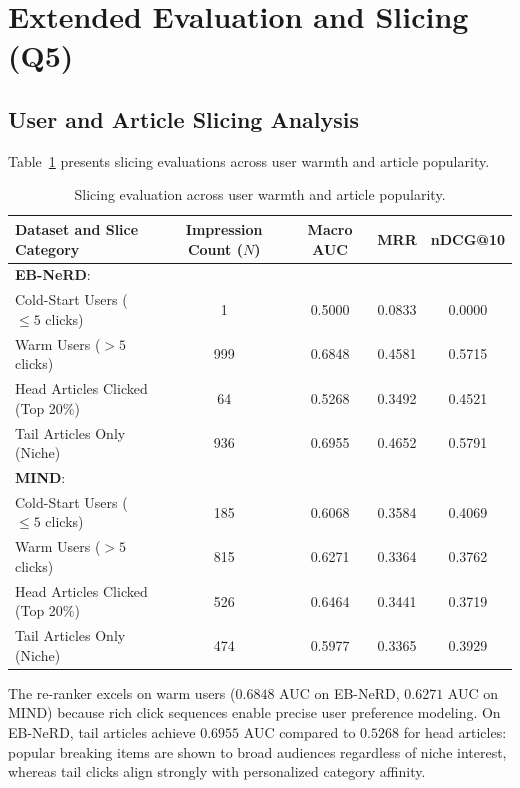 \documentclass[11pt,a4paper]{article}
\begin{document}
\section{Extended Evaluation and Slicing (Q5)}

\subsection{User and Article Slicing Analysis}
Table~\ref{tab:slicing} presents slicing evaluations across user warmth and article popularity.

\begin{table}[htbp]
\centering
\small
\setlength{\tabcolsep}{3pt}
\begin{tabular}{lcccc}
\toprule
\textbf{Dataset and Slice Category} & \textbf{Impression Count ($N$)} & \textbf{Macro AUC} & \textbf{MRR} & \textbf{nDCG@10} \\
\midrule
\textbf{EB-NeRD}: & & & & \\
\quad Cold-Start Users ($\le 5$ clicks) & 1 & 0.5000 & 0.0833 & 0.0000 \\
\quad Warm Users ($> 5$ clicks)         & 999 & 0.6848 & 0.4581 & 0.5715 \\
\quad Head Articles Clicked (Top 20\%) & 64 & 0.5268 & 0.3492 & 0.4521 \\
\quad Tail Articles Only (Niche)        & 936 & 0.6955 & 0.4652 & 0.5791 \\
\midrule
\textbf{MIND}: & & & & \\
\quad Cold-Start Users ($\le 5$ clicks) & 185 & 0.6068 & 0.3584 & 0.4069 \\
\quad Warm Users ($> 5$ clicks)         & 815 & 0.6271 & 0.3364 & 0.3762 \\
\quad Head Articles Clicked (Top 20\%) & 526 & 0.6464 & 0.3441 & 0.3719 \\
\quad Tail Articles Only (Niche)        & 474 & 0.5977 & 0.3365 & 0.3929 \\
\bottomrule
\end{tabular}
\caption{Slicing evaluation across user warmth and article popularity.}
\label{tab:slicing}
\end{table}

The re-ranker excels on warm users ($0.6848$ AUC on EB-NeRD, $0.6271$ AUC on MIND) because rich click sequences enable precise user preference modeling. On EB-NeRD, tail articles achieve $0.6955$ AUC compared to $0.5268$ for head articles: popular breaking items are shown to broad audiences regardless of niche interest, whereas tail clicks align strongly with personalized category affinity.
\end{document}
